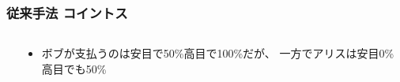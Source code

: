 \begin{frame}
  \frametitle{従来手法 コイントス}

  \begin{columns}
    \begin{column}{0.6\textwidth}

      \pause
    \end{column}
    \begin{column}{0.4\textwidth}
      \begin{itemize}
        \item ボブが支払うのは安目で50\%高目で100\%だが、
        一方でアリスは安目0\%高目でも50\%
      \end{itemize}
    \end{column}
  \end{columns}
\end{frame}

